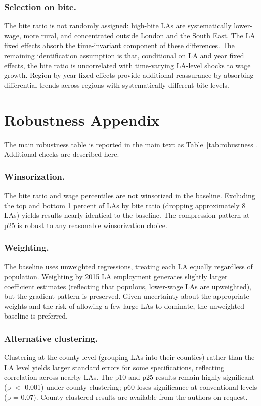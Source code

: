 \documentclass[12pt]{article}
\begin{document}
\subsubsection*{Selection on bite.}
The bite ratio is not randomly assigned: high-bite LAs are systematically lower-wage, more rural, and concentrated outside London and the South East. The LA fixed effects absorb the time-invariant component of these differences. The remaining identification assumption is that, conditional on LA and year fixed effects, the bite ratio is uncorrelated with time-varying LA-level shocks to wage growth. Region-by-year fixed effects provide additional reassurance by absorbing differential trends across regions with systematically different bite levels.

\section{Robustness Appendix}
\label{sec:robust_appendix}

The main robustness table is reported in the main text as Table~\ref{tab:robustness}. Additional checks are described here.

\subsubsection*{Winsorization.}
The bite ratio and wage percentiles are not winsorized in the baseline. Excluding the top and bottom 1 percent of LAs by bite ratio (dropping approximately 8 LAs) yields results nearly identical to the baseline. The compression pattern at p25 is robust to any reasonable winsorization choice.

\subsubsection*{Weighting.}
The baseline uses unweighted regressions, treating each LA equally regardless of population. Weighting by 2015 LA employment generates slightly larger coefficient estimates (reflecting that populous, lower-wage LAs are upweighted), but the gradient pattern is preserved. Given uncertainty about the appropriate weights and the risk of allowing a few large LAs to dominate, the unweighted baseline is preferred.

\subsubsection*{Alternative clustering.}
Clustering at the county level (grouping LAs into their counties) rather than the LA level yields larger standard errors for some specifications, reflecting correlation across nearby LAs. The p10 and p25 results remain highly significant (p $<$ 0.001) under county clustering; p60 loses significance at conventional levels (p = 0.07). County-clustered results are available from the authors on request.
\end{document}
